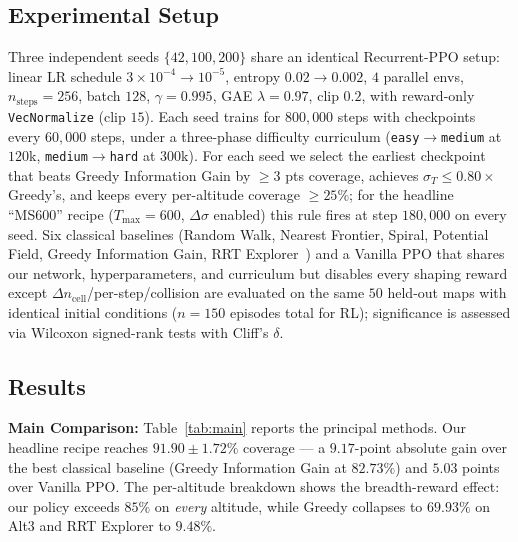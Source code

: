 \documentclass[conference]{IEEEtran}
\begin{document}
\subsection{Experimental Setup}

Three independent seeds $\{42,100,200\}$ share an identical Recurrent-PPO setup: linear LR schedule $3{\times}10^{-4}\!\to\!10^{-5}$, entropy $0.02\!\to\!0.002$, $4$ parallel envs, $n_{\text{steps}}{=}256$, batch $128$, $\gamma{=}0.995$, GAE $\lambda{=}0.97$, clip $0.2$, with reward-only \texttt{VecNormalize} (clip $15$). Each seed trains for $800{,}000$ steps with checkpoints every $60{,}000$ steps, under a three-phase difficulty curriculum (\texttt{easy}$\to$\texttt{medium} at $120$k, \texttt{medium}$\to$\texttt{hard} at $300$k). For each seed we select the earliest checkpoint that beats Greedy Information Gain by $\geq\!3$ pts coverage, achieves $\sigma_T\!\leq\!0.80\!\times\!$ Greedy's, and keeps every per-altitude coverage $\geq\!25\%$; for the headline ``MS600'' recipe ($T_{\max}\!=\!600$, $\Delta\sigma$ enabled) this rule fires at step $180{,}000$ on every seed. Six classical baselines (Random Walk, Nearest Frontier, Spiral, Potential Field, Greedy Information Gain, RRT Explorer~\cite{placed2023survey}) and a Vanilla PPO that shares our network, hyperparameters, and curriculum but disables every shaping reward except $\Delta n_{\text{cell}}$/per-step/collision are evaluated on the same $50$ held-out maps with identical initial conditions ($n\!=\!150$ episodes total for RL); significance is assessed via Wilcoxon signed-rank tests with Cliff's $\delta$.

\subsection{Results}\label{sec:results}

\textbf{Main Comparison:} Table~\ref{tab:main} reports the principal methods. Our headline recipe reaches $91.90\!\pm\!1.72\%$ coverage --- a $9.17$-point absolute gain over the best classical baseline (Greedy Information Gain at $82.73\%$) and $5.03$ points over Vanilla PPO. The per-altitude breakdown shows the breadth-reward effect: our policy exceeds $85\%$ on \emph{every} altitude, while Greedy collapses to $69.93\%$ on Alt3 and RRT Explorer to $9.48\%$.
\end{document}
